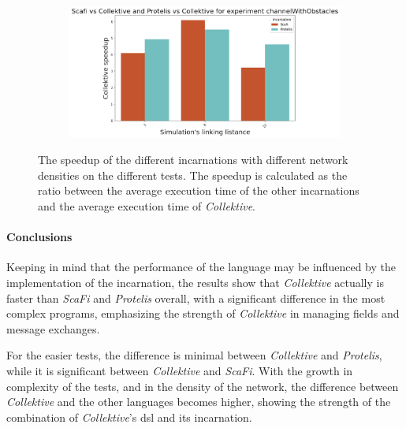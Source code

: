 \begin{figure}[ht!]
\begin{subfigure}[b]{0.49\textwidth}
    \end{subfigure}
    \begin{subfigure}[b]{0.49\textwidth}
        \centering
        \includegraphics[width=\textwidth]{figures/channel-speedup}
    \end{subfigure}
    \caption{The speedup of the different incarnations with different network densities on the different tests.
        The speedup is calculated as the ratio between the average execution time of the other incarnations and the average
        execution time of \emph{Collektive}.}
    \label{fig:speedup}
\end{figure}

\paragraph{Conclusions}
Keeping in mind that the performance of the language may be influenced by the implementation of the incarnation, the results
show that \emph{Collektive} actually is faster than \emph{ScaFi} and \emph{Protelis} overall, with a significant
difference in the most complex programs, emphasizing the strength of \emph{Collektive} in managing fields and message exchanges.

For the easier tests, the difference is minimal between \emph{Collektive} and \emph{Protelis}, while it is significant
between \emph{Collektive} and \emph{ScaFi}.
With the growth in complexity of the tests, and in the density of the network, the difference between \emph{Collektive}
and the other languages becomes higher, showing the strength of the combination of \emph{Collektive}'s \ac{dsl} and its incarnation.

